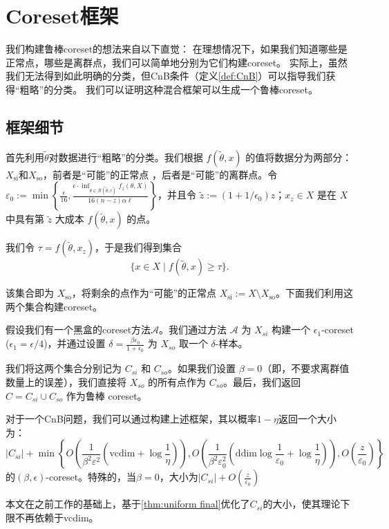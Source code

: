 \chapter{Coreset框架}

我们构建鲁棒coreset的想法来自以下直觉：
在理想情况下，如果我们知道哪些是正常点，哪些是离群点，我们可以简单地分别为它们构建coreset。
实际上，虽然我们无法得到如此明确的分类，但CnB条件（定义\ref{def:CnB}）可以指导我们获得“粗略”的分类。
我们可以证明这种混合框架可以生成一个鲁棒coreset。

\section{框架细节}

首先利用$\tilde{\theta}$对数据进行“粗略”的分类。我们根据 $f(\tilde{\theta}, x)$ 的值将数据分为两部分：$X_{\text{si}}$和$X_{\text{so}}$，前者是“可能”的正常点
，后者是“可能”的离群点。令 $\varepsilon_0 := \min \left\{ \frac{\epsilon}{16}, \frac{\epsilon \cdot \inf_{\theta \in \mathcal{B}(\tilde{\theta}, \epsilon)} f_z(\theta, X)}{16(n - z) \alpha \ell} \right\}$，并且令 $\tilde{z} := (1 + 1/\epsilon_0) z$；$x_z \in X$ 是在 $X$ 中具有第 $\tilde{z}$ 大成本 $f(\tilde{\theta}, x)$ 的点。

我们令 $\tau = f(\tilde{\theta}, x_z)$，于是我们得到集合
\begin{equation}
\{ x \in X \mid f(\tilde{\theta}, x) \geq \tau \}.
\end{equation}

该集合即为 $X_{\text{so}}$，将剩余的点作为“可能”的正常点 $X_{\text{si}} := X \setminus X_{\text{so}}$。下面我们利用这两个集合构建coreset。

假设我们有一个黑盒的coreset方法$\mathcal{A}$。我们通过方法 $\mathcal{A}$ 为 $X_{si}$ 构建一个 $\epsilon_1$-coreset ($\epsilon_1 = \epsilon / 4$)，并通过设置 $\delta = \frac{\beta \epsilon_0}{1 + \epsilon_0}$ 为 $X_{so}$ 取一个 $\delta$-样本。

我们将这两个集合分别记为 $C_{si}$ 和 $C_{so}$。如果我们设置 $\beta = 0$（即，不要求离群值数量上的误差），我们直接将 $X_{so}$ 的所有点作为 $C_{so}$。最后，我们返回 $C = C_{si} \cup C_{so}$ 作为鲁棒 coreset。

\begin{theorem}
    对于一个CnB问题，我们可以通过构建上述框架，其以概率$1-\eta$返回一个大小为：
    \begin{equation*}
        |C_{si}|+\min\left\{O\left(\frac{1}{\beta^2\varepsilon^2}(\text{vcdim}+\log \frac 1 \eta)\right),O\left(\frac{1}{\beta^2\varepsilon_0^2}(\text{ddim}\log\frac{1}{\varepsilon_0}+\log \frac{1}{\eta})\right),O\left(\frac z {\varepsilon_0}\right)\right\}
    \end{equation*}
的$(\beta,\epsilon)$-coreset。特殊的，当$\beta = 0$，大小为$|C_{si}|+O\left(\frac{z}{\varepsilon_0}\right)$
\end{theorem}
本文在之前工作的基础上，基于\ref{thm:uniform final}优化了$C_{si}$的大小，使其理论下限不再依赖于vcdim。